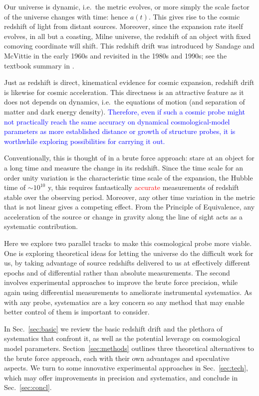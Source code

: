 \documentclass[preprint2, 10pt]{aastex}
\begin{document}
Our universe is dynamic, i.e.\ the metric evolves, or more simply the 
scale factor of the universe changes with time: hence $a(t)$.  This 
gives rise to the cosmic redshift of light from distant sources.  Moreover, 
since the expansion rate itself evolves, in all but a coasting, Milne 
universe, the redshift of an object with fixed comoving coordinate will shift.  This redshift drift was 
introduced by Sandage \citep{sandage} and McVittie \citep{mcvittie} in the 
early 1960s and revisited in the 1980s and 1990s; see the textbook 
summary in \citet{fpoc}. 

Just as redshift is direct, kinematical evidence for cosmic expansion, 
redshift drift is likewise for cosmic acceleration.  This directness is 
an attractive feature as it does not depends on dynamics, i.e.\ the equations 
of motion (and separation of matter and dark energy density). 
\textcolor{blue}{Therefore, 
even if such a cosmic probe might not practically reach the same 
accuracy on dynamical cosmological-model parameters as more established
distance or growth of structure probes,  it is worthwhile exploring possibilities 
for carrying it out. 
}

Conventionally, this is thought of in a brute force approach: stare at an 
object for a long time and measure the change in its redshift.  
Since the time scale for an order unity variation is the characteristic 
time scale of the expansion, the Hubble time of $\sim10^{10}$ y, this 
requires fantastically \textcolor{red}{accurate} measurements of redshift stable over the 
observing period.  Moreover, any other time variation in the metric that 
is not linear gives a competing effect.  From the Principle of Equivalence, 
any acceleration of the source or change in gravity along the line of sight 
acts as a systematic contribution. 

Here we explore two parallel tracks to make this cosmological probe more 
viable. One is exploring theoretical ideas for letting the universe do the 
difficult work for us, by taking advantage of source redshifts delivered 
to us at effectively different epochs and of differential rather than absolute 
measurements.  The second involves experimental approaches to improve the 
brute force precision, while again using differential measurements to 
ameliorate instrumental systematics. As with any probe, systematics are a 
key concern so any method that may enable better control of them is 
important to consider. 

In Sec.~\ref{sec:basic} we review the basic redshift drift and the plethora 
of systematics that confront it, as well as the potential leverage on 
cosmological model parameters.  Section~\ref{sec:methods} outlines three 
theoretical alternatives to the brute force approach, each with their own 
advantages and speculative aspects. 
We turn to some innovative experimental approaches in Sec.~\ref{sec:tech}, 
which may offer improvements in precision and systematics, and conclude in 
Sec.~\ref{sec:concl}. 
\end{document}
